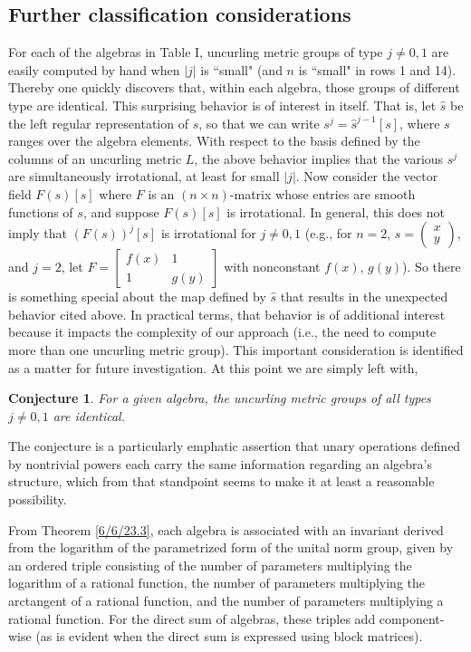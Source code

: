 \documentclass{amsart}
\numberwithin{equation}{section}
\newtheorem*{conjecture}{Conjecture}
\theoremstyle{definition}
\numberwithin{theorem}{section}
\begin{document}
\subsection{Further classification considerations} For each of the algebras in Table I, uncurling metric groups of type $j\ne 0,1$ are easily computed by hand when  $|j|$ is ``small" (and $n$ is ``small" in rows 1 and 14).  
Thereby one quickly discovers that, within each algebra, those groups of different type are identical.  This surprising behavior is of interest in itself.  That is, let $\hat{s}$ be the left regular representation of $s$, so that we can write $s^j = \hat{s}^{j-1}[s]$, where $s$ ranges over the algebra elements. With respect to the basis defined by the columns of an uncurling metric $L$, the above behavior implies that the various $s^j$ are simultaneously irrotational, at least for small $|j|$.  Now consider the vector field $F(s)[s]$ where $F$ is an \mbox{$(n\times n)$-matrix} whose entries are smooth functions of $s$, and suppose $F(s)[s]$ is irrotational.  In general, this does not imply that $(F(s))^j[s]$ is irrotational for $j\ne 0,1$ (e.g., for \mbox{$n=2$}, $s=\left(\begin{array}{ccc}
 x   \\ 
y    
\end{array}\right)$, and $j=2$, let $F= \left[\begin{array}{ccc}
 f(x) & 1   \\ 
 1 & g(y)    
\end{array}\right]$ with nonconstant $f(x)$, $g(y)$).  So there is something special about the map defined by $\hat{s}$ that results in the unexpected behavior cited above. 
In practical terms, that behavior is of additional interest because it impacts the complexity of our approach (i.e., the need to compute more than one uncurling metric group).  This important consideration is identified as a matter for future investigation. At this point we are simply left with,
\begin{conjecture} For a given algebra, the uncurling metric groups of all types $j\ne 0,1$ are identical. 
\end{conjecture}
\noindent The conjecture is a particularly emphatic assertion that unary operations defined by nontrivial powers each carry the same information regarding an algebra's structure, which from that standpoint seems to make it at least a reasonable possibility.  

 From Theorem \ref{6/6/23.3}, each algebra is associated with an invariant derived from the logarithm of the parametrized form of the unital norm group, given by an ordered triple consisting of the number of parameters multiplying the logarithm of a rational function, the number of parameters multiplying the arctangent of a rational function, and the
 \enlargethispage{1cm} number of parameters multiplying a rational function.  For the direct sum of algebras, these triples add component-wise (as is evident when the direct sum is expressed using block matrices).
\end{document}
